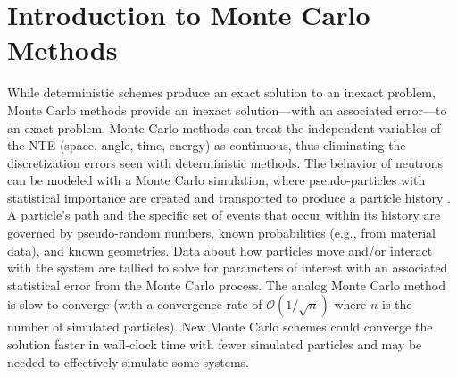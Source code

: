 



\chapter{Introduction to Monte Carlo Methods}

\label{chap:mc_methods_intro}


While deterministic schemes produce an exact solution to an inexact problem, Monte Carlo methods provide an inexact solution---with an associated error---to an exact problem.
Monte Carlo methods can treat the independent variables of the NTE (space, angle, time, energy) as continuous, thus eliminating the discretization errors seen with deterministic methods.
The behavior of neutrons can be modeled with a Monte Carlo simulation, where pseudo-particles with statistical importance are created and transported to produce a particle history \cite{lewis_computational_1984}.
A particle's path and the specific set of events that occur within its history are governed by pseudo-random numbers, known probabilities (e.g., from material data), and known geometries.
Data about how particles move and/or interact with the system are tallied to solve for parameters of interest with an associated statistical error from the Monte Carlo process. 
The analog Monte Carlo method is slow to converge (with a convergence rate of $\mathcal{O}(1/\sqrt{n})$ where $n$ is the number of simulated particles).
New Monte Carlo schemes could converge the solution faster in wall-clock time with fewer simulated particles and may be needed to effectively simulate some systems.


